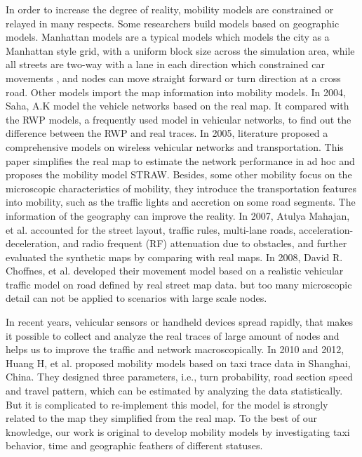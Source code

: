 In order to increase the degree of reality, mobility models are constrained or relayed in many respects. Some researchers build models based on geographic models. Manhattan models \cite{FBaimanhattan} are a typical models which models the city as a Manhattan style grid, with a uniform block size across the simulation area, while all streets are two-way with a lane in each direction which constrained car movements \cite{MartinezCano-87}, and nodes can move straight forward or turn direction at a cross road.
Other models import the map information into mobility models. In 2004, Saha, A.K \cite{SahaJohnson-91} model the vehicle networks based on the real map. It compared with the RWP models, a frequently used model in vehicular networks, to find out the difference between the RWP and real traces. In 2005, literature \cite{ChoffnesBustamante-93} proposed a comprehensive models on wireless vehicular networks and transportation. This paper simplifies the real map to estimate the network performance in ad hoc and proposes the mobility model STRAW. Besides, some other mobility focus on the microscopic characteristics of mobility, they introduce the transportation features into mobility, such as the traffic lights and accretion on some road segments. The information of the geography can improve the reality. In 2007, Atulya Mahajan, et al. \cite{MahajanPotnis-102} accounted for the street layout, traffic rules, multi-lane roads, acceleration-deceleration, and radio frequent (RF) attenuation due to obstacles, and further evaluated the synthetic maps by comparing with real maps. In 2008, David R. Choffnes, et al.\cite{ChoffnesBustamante-93} developed their movement model based on a realistic vehicular traffic model on road defined by real street map data. but too many microscopic detail can not be applied to scenarios with large scale nodes.

In recent years, vehicular sensors or handheld devices spread rapidly, that makes it possible to collect and analyze the real traces of large amount of nodes and helps us to improve the traffic and network macroscopically.
In 2010 and 2012, Huang H, et al. \cite{HuangZhu-88} proposed mobility models based on taxi trace data in Shanghai, China. They designed three parameters, i.e., turn probability, road section speed and travel pattern, which can be estimated by analyzing the data statistically. But it is complicated to re-implement this model, for the model is strongly related to the map they simplified from the real map.
To the best of our knowledge, our work is original to develop mobility models by investigating taxi behavior, time and geographic feathers of different statuses.
